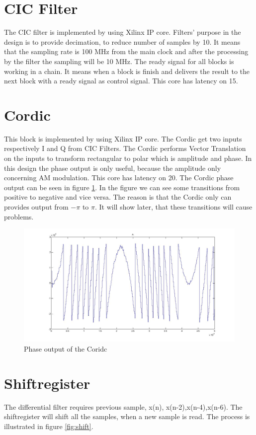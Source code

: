 \section{CIC Filter}
The CIC filter is implemented by using Xilinx IP core. Filters' purpose in the design is to provide decimation, to reduce number of samples by 10. It means that the sampling rate is 100 MHz from the main clock and after the processing by the filter the sampling will be 10 MHz. The ready signal for all blocks is working in a chain. It means when a block is finish and delivers the result to the next block with a ready signal as control signal. This core has latency on 15.

\section{Cordic}
This block is implemented by using Xilinx IP core. The Cordic get two inputs respectively I and Q from CIC Filters. The Cordic performs Vector Translation on the inputs to transform rectangular to polar which is amplitude and phase. In this design the phase output is only useful, because the amplitude only concerning AM modulation. This core has latency on 20. The Cordic phase output can be seen in figure \ref{fig:cordic}. In the figure we can see some transitions from positive to negative and vice versa. The reason is that the Cordic only can provides output from $-\pi$ to $\pi$. It will show later, that these transitions will cause problems.

\begin{figure}[h]
 \centering
 \includegraphics[scale=0.2]{images/cordic.jpg}
 \caption{Phase output of the Coridc}
 \label{fig:cordic}
\end{figure}

\section{Shiftregister}
The differential filter requires previous sample, x(n), x(n-2),x(n-4),x(n-6). The shiftregister will shift all the samples, when a new sample is read. The process is illustrated in figure \ref{fig:shift}.

